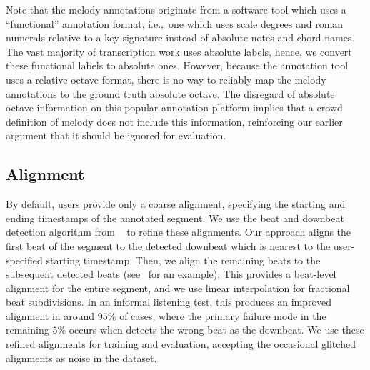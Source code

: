 Note that the melody annotations originate from a software tool which uses a ``functional'' annotation format, i.e.,~one which uses scale degrees and roman numerals relative to a key signature instead of absolute notes and chord names. 
The vast majority of transcription work uses absolute labels, hence, we convert these functional labels to absolute ones. 
However, because the annotation tool uses a relative octave format, there is no way to reliably map the melody annotations to the ground truth absolute octave. 
The disregard of absolute octave information on this popular annotation platform implies that a crowd definition of melody does not include this information, reinforcing our earlier argument that it should be ignored for evaluation.

\subsection{Alignment}

By default, \hooktheory{} users provide only a coarse alignment, specifying the starting and ending timestamps of the annotated segment. 
We use the beat and downbeat detection algorithm from \madmom{}~\cite{bock2016joint,bock2016madmom} to refine these alignments. 
Our approach aligns the first beat of the segment to the detected downbeat which is nearest to the user-specified starting timestamp. 
Then, we align the remaining beats to the subsequent detected beats (see~ for an example). 
This provides a beat-level alignment for the entire segment, and we use linear interpolation for fractional beat subdivisions. 
In an informal listening test, this produces an improved alignment in around $95\%$ of cases, where the primary failure mode in the remaining $5\%$ occurs when \madmom{} detects the wrong beat as the downbeat. 
We use these refined alignments for training and evaluation, accepting the occasional glitched alignments as noise in the dataset.
